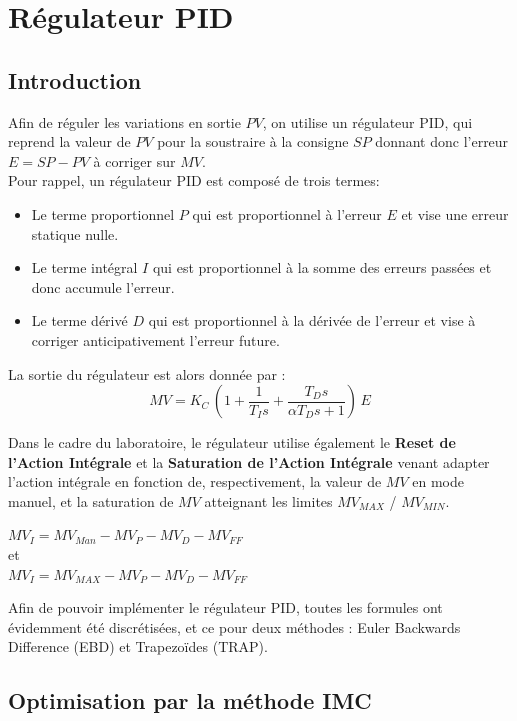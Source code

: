 \section{Régulateur PID}

\subsection{Introduction}

Afin de réguler les variations en sortie $PV$, on utilise un régulateur PID, qui reprend la valeur de $PV$ pour la soustraire à la consigne $SP$ donnant donc l'erreur $E = SP - PV$ à corriger sur $MV$.\\
Pour rappel, un régulateur PID est composé de trois termes:
\begin{itemize}
    \item Le terme proportionnel $P$ qui est proportionnel à l'erreur $E$ et vise une erreur statique nulle.
    \item Le terme intégral $I$ qui est proportionnel à la somme des erreurs passées et donc accumule l'erreur.
    \item Le terme dérivé $D$ qui est proportionnel à la dérivée de l'erreur et vise à corriger anticipativement l'erreur future.
\end{itemize}
La sortie du régulateur est alors donnée par :
\begin{equation}\label{eq:PID}
    MV = K_C \, \left( 1 + \frac{1}{T_I s} + \frac{T_D s}{\alpha T_D s + 1}\right) \, E
\end{equation}

Dans le cadre du laboratoire, le régulateur utilise également le \textbf{Reset de l'Action Intégrale} et la \textbf{Saturation de l'Action Intégrale} venant adapter l'action intégrale en fonction de, respectivement, la valeur de $MV$ en mode manuel, et la saturation de $MV$ atteignant les limites $MV_{MAX}$ / $MV_{MIN}$.
\begin{center}
    $MV_I = MV_{Man} - MV_P - MV_D - MV_{FF}$\\[4pt]
    et\\[4pt]
    $MV_I = MV_{MAX} - MV_P - MV_D - MV_{FF}$
\end{center}

Afin de pouvoir implémenter le régulateur PID, toutes les formules ont évidemment été discrétisées, et ce pour deux méthodes : Euler Backwards Difference (EBD) et Trapezoïdes (TRAP).

\subsection{Optimisation par la méthode IMC}

